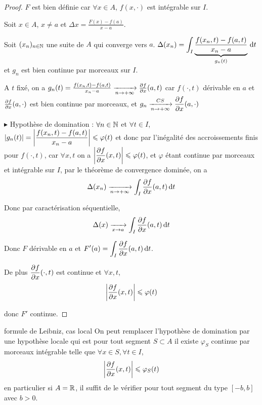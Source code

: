 \begin{proof}
    $F$ est bien définie car $\forall x \in A$, $f(x, \cdot)$ est intégrable sur $I$.

    Soit $x \in A$, $x \neq a$ et $\Delta x = \frac{F(x) - f(a)}{x - a }$.

    Soit $(x_n)_{n \in \mathbb{N}}$ une suite de $A$ qui converge vers $a$. 
    $\Delta(x_n) = \displaystyle \int_I \underbrace{\frac{f(x_n, t) - f(a, t)}{x_n - a }}_{g_n(t)} \,\mathrm{d}t$
    et $g_n$ est bien continue par morceaux sur $I$. 

    A $t$ fixé, on a $g_n(t) = \frac{f(x_n, t) - f(a, t)}{x_n - a } \xrightarrow[n \to + \infty]{} \frac{\partial f}{\partial x} (a, t)$
    car $f(\cdot, t)$ dérivable en $a$ et $\frac{\partial f}{\partial x} (a, \cdot)$ est bien continue par morceaux, et $ \displaystyle g_n \xrightarrow[n \to + \infty]{CS} \frac{\partial f}{\partial x} (a, \cdot)$


    \avspace $\blacktriangleright$ Hypothèse de domination : $\forall n \in \mathbb{N}$ et $\forall t \in I$, 
    $\displaystyle |g_n(t)| = \left| \frac{f(x_n, t) - f(a, t)}{x_n - a } \right| \leqslant \varphi(t)$ et 
    donc par l'inégalité des accroissements finis pour $f(\cdot, t)$, car $\forall x, t$ on a $\displaystyle \left| \frac{\partial f}{\partial x} (x, t) \right| \leqslant \varphi(t)$, 
    et $\varphi$ étant continue par morceaux et intégrable sur $I$, par le théorème de convergence dominée, on a
    $$\Delta(x_n) \xrightarrow[n \to + \infty]{} \int_I \frac{\partial f}{\partial x} (a, t) \,\mathrm{d}t$$

    Donc par caractérisation séquentielle, 
    $$\Delta(x) \xrightarrow[x \to a]{} \int_I \frac{\partial f}{\partial x} (a, t) \,\mathrm{d}t$$

    Donc $F$ dérivable en $a$ et $\displaystyle F'(a) = \int_I \frac{\partial f}{\partial x} (a, t) \,\mathrm{d}t$.

    De plus $\displaystyle \frac{\partial f}{\partial x} (\cdot, t)$ est continue et $\forall x, t$, 
    $$\left| \frac{\partial f}{\partial x} (x, t) \right| \leqslant \varphi(t)$$

    donc $F'$ continue. 
\end{proof}

\begin{theoreme}{formule de Leibniz, cas local}{}
    On peut remplacer l'hypothèse de domination par une hypothèse locale qui est pour tout segment 
    $S \subset A$ il existe $\varphi_S$ continue par morceaux intégrable telle que 
    $\forall x \in S, \forall t \in I$,
    $$\left| \frac{\partial f}{\partial x} (x, t) \right| \leqslant \varphi_S(t)$$
    en particulier si $A = \mathbb{R}$, il suffit de le vérifier pour tout segment du type $[-b, b]$ avec $b > 0$.
\end{theoreme}

